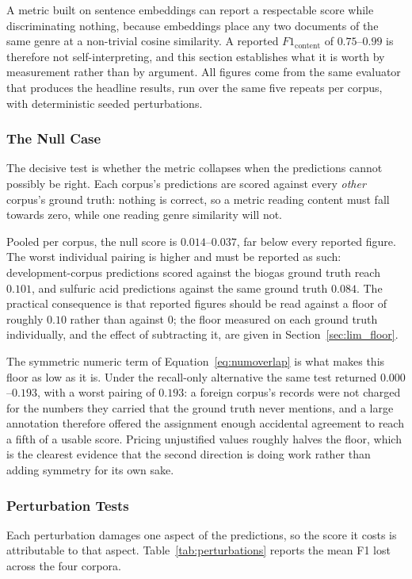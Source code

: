\documentclass[11pt]{article}
\begin{document}
A metric built on sentence embeddings can report a respectable score while
discriminating nothing, because embeddings place any two documents of the same
genre at a non-trivial cosine similarity. A reported $F1_{\text{content}}$ of
$0.75$--$0.99$ is therefore not self-interpreting, and this section establishes
what it is worth by measurement rather than by argument. All figures come from
the same evaluator that produces the headline results, run over the same five
repeats per corpus, with deterministic seeded perturbations.

\subsubsection{The Null Case}
The decisive test is whether the metric collapses when the predictions cannot
possibly be right. Each corpus's predictions are scored against every \emph{other}
corpus's ground truth: nothing is correct, so a metric reading content must fall
towards zero, while one reading genre similarity will not.

Pooled per corpus, the null score is $0.014$--$0.037$, far below every reported
figure. The worst individual pairing is higher and must be reported as such:
development-corpus predictions scored against the biogas ground truth reach
$0.101$, and sulfuric acid predictions against the same ground truth $0.084$.
The practical consequence is that reported figures should be read against a
floor of roughly $0.10$ rather than against $0$; the floor measured on each
ground truth individually, and the effect of subtracting it, are given in
Section~\ref{sec:lim_floor}.

The symmetric numeric term of Equation~\ref{eq:numoverlap} is what makes this
floor as low as it is. Under the recall-only alternative the same test returned
$0.000$--$0.193$, with a worst pairing of $0.193$: a foreign corpus's records
were not charged for the numbers they carried that the ground truth never
mentions, and a large annotation therefore offered the assignment enough
accidental agreement to reach a fifth of a usable score. Pricing unjustified
values roughly halves the floor, which is the clearest evidence that the second
direction is doing work rather than adding symmetry for its own sake.

\subsubsection{Perturbation Tests}
Each perturbation damages one aspect of the predictions, so the score it costs is
attributable to that aspect. Table~\ref{tab:perturbations} reports the mean F1
lost across the four corpora.
\end{document}
